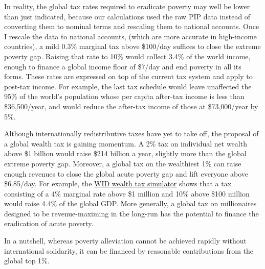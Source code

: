 In reality, the global tax rates required to eradicate poverty may well be lower than just indicated, because our calculations used the raw PIP data instead of converting them to nominal terms and rescaling them to national accounts. Once I rescale the data to national accounts, (which are more accurate in high-income countries), 
a mild 0.3\% marginal tax above \$100/day suffices to close the extreme poverty gap. Raising that rate to 10\% would collect 3.4\% of the world income, enough to finance a global income floor of \$7/day and end poverty in all its forms. 
These rates are expressed on top of the current tax system and apply to post-tax income. For example, the last tax schedule would leave unaffected the 95\% of the world's population whose per capita after-tax income is less than \$36,500/year, and would reduce the after-tax income of those at \$73,000/year by 5\%. 


Although internationally redistributive taxes have yet to take off, the proposal of a global wealth tax is gaining momentum.\cite{piketty_brief_2022} A 2\% tax on individual net wealth above \$1 billion would raise \$214 billion a year, slightly more than the global extreme poverty gap.\cite{tax_observatory_global_2024} Moreover, a global tax on the wealthiest 1\% can raise enough revenues to close the global acute poverty gap and lift everyone above \$6.85/day. For example, the \href{https://wid.world/world-wealth-tax-simulator}{WID wealth tax simulator} shows that a tax consisting of a 4\% marginal rate above \$1 million and 10\% above \$100 million would raise 4.4\% of the global GDP. More generally, a global tax on millionaires designed to be revenue-maximing in the long-run has the potential to finance the eradication of acute poverty. 

In a nutshell, whereas poverty alleviation cannot be achieved rapidly without international solidarity, it can be financed by reasonable contributions from the global top 1\%.

